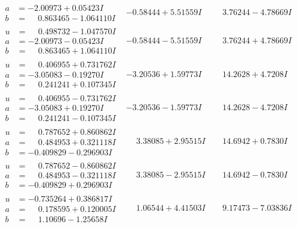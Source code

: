 \documentclass[1p]{elsarticle_modified}
\theoremstyle{definition}
\begin{document}
$$\begin{array}{c|c|c}
\begin{aligned}
a &= -2.00973 + 0.05423 I \\
b &= \phantom{-}0.863465 - 1.064110 I\end{aligned}
 & -0.58444 + 5.51559 I & \phantom{-}3.76244 - 4.78669 I \\ \hline\begin{aligned}
u &= \phantom{-}0.498732 - 1.047570 I \\
a &= -2.00973 - 0.05423 I \\
b &= \phantom{-}0.863465 + 1.064110 I\end{aligned}
 & -0.58444 - 5.51559 I & \phantom{-}3.76244 + 4.78669 I \\ \hline\begin{aligned}
u &= \phantom{-}0.406955 + 0.731762 I \\
a &= -3.05083 - 0.19270 I \\
b &= \phantom{-}0.241241 + 0.107345 I\end{aligned}
 & -3.20536 + 1.59773 I & \phantom{-}14.2628 + 4.7208 I \\ \hline\begin{aligned}
u &= \phantom{-}0.406955 - 0.731762 I \\
a &= -3.05083 + 0.19270 I \\
b &= \phantom{-}0.241241 - 0.107345 I\end{aligned}
 & -3.20536 - 1.59773 I & \phantom{-}14.2628 - 4.7208 I \\ \hline\begin{aligned}
u &= \phantom{-}0.787652 + 0.860862 I \\
a &= \phantom{-}0.484953 + 0.321118 I \\
b &= -0.409829 - 0.296903 I\end{aligned}
 & \phantom{-}3.38085 + 2.95515 I & \phantom{-}14.6942 + 0.7830 I \\ \hline\begin{aligned}
u &= \phantom{-}0.787652 - 0.860862 I \\
a &= \phantom{-}0.484953 - 0.321118 I \\
b &= -0.409829 + 0.296903 I\end{aligned}
 & \phantom{-}3.38085 - 2.95515 I & \phantom{-}14.6942 - 0.7830 I \\ \hline\begin{aligned}
u &= -0.735264 + 0.386817 I \\
a &= \phantom{-}0.178595 + 0.120005 I \\
b &= \phantom{-}1.10696 - 1.25658 I\end{aligned}
 & \phantom{-}1.06544 + 4.41503 I & \phantom{-}9.17473 - 7.03836 I \\ \hline\begin{aligned}

\end{aligned}
\end{array}$$
\end{document}
